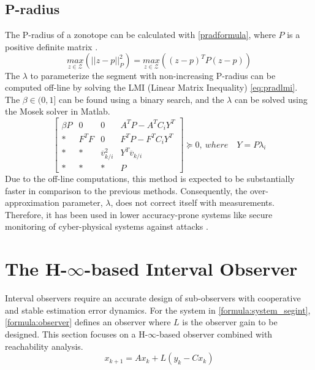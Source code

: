 \subsection{P-radius}
The P-radius of a zonotope can be calculated with \eqref{pradformula}, where $P$ is a positive definite matrix \cite{Alamo2005}.
\begin{equation}
\label{pradformula}
\underset{z \in \mathcal{Z}}{max} (||z - p||^2_{P}) = \underset{z \in \mathcal{Z}}{max}((z-p)^T P (z-p))
\end{equation}
The $\lambda$ to parameterize the segment with non-increasing P-radius can be computed off-line by solving the LMI (Linear Matrix Inequality) \eqref{eq:pradlmi}. The $\beta \in (0,1]$ can be found using a binary search, and the $\lambda$ can be solved using the Mosek solver in Matlab\textsuperscript{\tiny\textregistered}.
\begin{equation}
\label{eq:pradlmi}
\left[
\begin{matrix}
\beta P & 0 & 0 & A^TP - A^TC_iY^T\\
* & F^TF & 0 & F^TP -F^TC_iY^T\\
* & * & \overline{v}_{k/i}^2 & Y^T\overline{v}_{k/i}\\
* & * & * & P
\end{matrix}\right] \succeq 0,
~where\quad Y = P\lambda_i
\end{equation}
Due to the off-line computations, this method is expected to be substantially faster in comparison to the previous methods. Consequently, the over-approximation parameter, $\lambda$, does not correct itself with measurements. Therefore, it has been used in lower accuracy-prone systems like secure monitoring of cyber-physical systems against attacks \cite{GE20201592}. 

\section{The H-$\infty$-based Interval Observer}
Interval observers require an accurate design of sub-observers with cooperative and stable estimation error dynamics. For the system in \eqref{formula:system_segint}, \eqref{formula:observer} defines an observer where $L$ is the observer gain to be designed. This section focuses on a H-$\infty$-based observer combined with reachability analysis.
\begin{equation}
\label{formula:observer}
x_{k+1} = Ax_k + L(y_k -Cx_k)
\end{equation}


